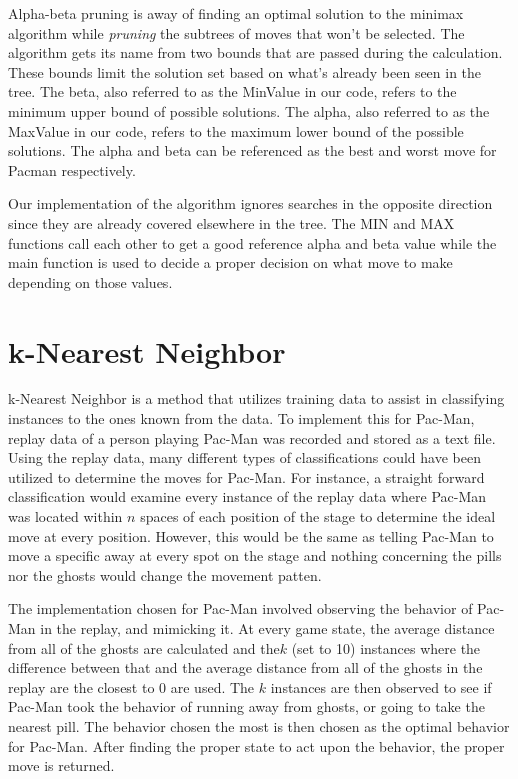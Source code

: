 \documentclass[a4paper,oneside,10pt]{report}
\begin{document}
Alpha-beta pruning is away of finding an optimal solution to the minimax algorithm while \textit{pruning} the subtrees of moves that won't be selected. The algorithm gets its name from two bounds that are passed during the calculation. These bounds limit the solution set based on what's already been seen in the tree. The beta, also referred to as the MinValue in our code, refers to the minimum upper bound of possible solutions. The alpha, also referred to as the MaxValue in our code, refers to the maximum lower bound of the possible solutions. The alpha and beta can be referenced as the best and worst move for Pacman respectively. 

Our implementation of the algorithm ignores searches in the opposite direction since they are already covered elsewhere in the tree. The MIN and MAX functions call each other to get a good reference alpha and beta value while the main function is used to decide a proper decision on what move to make depending on those values.

\section{k-Nearest Neighbor}\label{knn}

k-Nearest Neighbor is a method that utilizes training data to assist in classifying instances to the ones known from the data. To implement this for Pac-Man, replay data of a person playing Pac-Man was recorded and stored as a text file. Using the replay data, many different types of classifications could have been utilized to determine the moves for Pac-Man. For instance, a straight forward classification would examine every instance of the replay data where Pac-Man was located within $n$ spaces of each position of the stage to determine the ideal move at every position. However, this would be the same as telling Pac-Man to move a specific away at every spot on the stage and nothing concerning the pills nor the ghosts would change the movement patten. 

The implementation chosen for Pac-Man involved observing the behavior of Pac-Man in the replay, and mimicking it. At every game state, the average distance from all of the ghosts are calculated and the$k$ (set to 10) instances where the difference between that and the average distance from all of the ghosts in the replay are the closest to 0 are used. The $k$ instances are then observed to see if Pac-Man took the behavior of running away from ghosts, or going to take the nearest pill. The behavior chosen the most is then chosen as the optimal behavior for Pac-Man. After finding the proper state to act upon the behavior, the proper move is returned.
\end{document}
